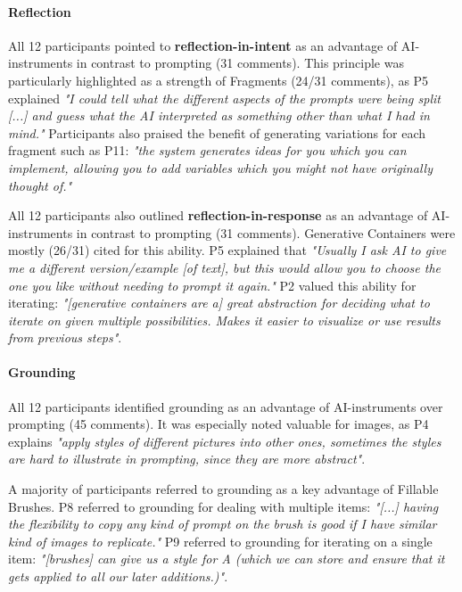  

\paragraph{\textbf{Reflection}}

All 12 participants pointed to \textbf{reflection-in-intent} as an advantage of AI-instruments in contrast to prompting (31 comments). This principle was particularly highlighted as a strength of Fragments (24/31 comments), as P5 explained \textit{"I could tell what the different aspects of the prompts were being split [...] and guess what the AI interpreted as something other than what I had in mind."} Participants also praised the benefit of generating variations for each fragment such as P11: \textit{"the system generates ideas for you which you can implement, allowing you to add variables which you might not have originally thought of."} 


All 12 participants also outlined \textbf{reflection-in-response} as an advantage of AI-instruments in contrast to prompting (31 comments). Generative Containers were mostly (26/31) cited for this ability. P5 explained that \textit{"Usually I ask AI to give me a different version/example [of text], but this would allow you to choose the one you like without needing to prompt it again."} P2 valued this ability for iterating: \textit{"[generative containers are a] great abstraction for deciding what to iterate on given multiple possibilities. Makes it easier to visualize or use results from previous steps"}.















\paragraph{\textbf{Grounding}}

All 12 participants identified grounding as an advantage of AI-instruments over prompting (45 comments). It was especially noted valuable for images, as P4 explains \textit{"apply styles of different pictures into other ones, sometimes the styles are hard to illustrate in prompting, since they are more abstract"}.

A majority of participants referred to grounding as a key advantage of Fillable Brushes. P8 referred to grounding for dealing with multiple items: \textit{"[...] having the flexibility to copy any kind of prompt on the brush is good if I have similar kind of images to replicate."} P9 referred to grounding for iterating on a single item: \textit{"[brushes] can give us a style for A (which we can store and ensure that it gets applied to all our later additions.)"}. 



